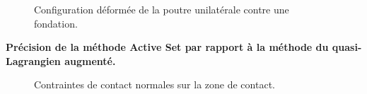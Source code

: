 \begin{figure}[ht!]
	\begin{center}
	 \caption{Configuration déformée de la poutre unilatérale contre une fondation.}
		\label{poutre_def2}
	\end{center}
	
\end{figure}
\noindent\textbf{Précision de la méthode Active Set par rapport à la méthode du quasi-Lagrangien augmenté.}\\
\begin{figure}[ht!]
	\begin{center}
	\end{center}
	\caption{Contraintes de contact normales sur la zone de contact.}
	\label{cont_uniS}
\end{figure}
